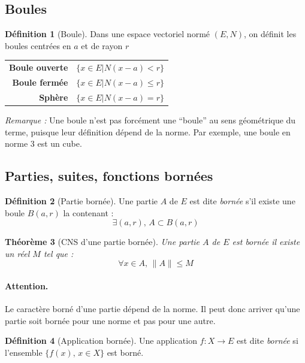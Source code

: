 \documentclass[11pt,a4paper]{report}
\newtheorem{theorem}{Théorème}[chapter]
\theoremstyle{definition}
\newtheorem{dfn}[theorem]{Définition}
\begin{document}
\subsection{Boules} %
\label{sub:boules}
\begin{dfn}[Boule]
Dans une espace vectoriel normé $(E,N)$, on définit les boules centrées en $a$ et de rayon $r$
    \begin{tabular}{>{\bfseries}r @{ de rayon $r$ centrée en $a$ : $\quad$ } l}
    Boule ouverte & $\{x \in E | N(x-a)< r \} $ \\
    Boule fermée & $\{x \in E | N(x-a)\le r \} $ \\
    Sphère & $\{x \in E | N(x-a)= r \} $ \\
    \end{tabular}
\end{dfn}
\emph{Remarque :} Une boule n'est pas forcément une ``boule'' au sens géométrique du terme, puisque leur définition dépend de la norme. Par exemple, une boule en norme 3 est un cube.

\subsection{Parties, suites, fonctions bornées} %
\label{sub:parties_suites_fonctions_bornees}
\begin{dfn}[Partie bornée]
     Une partie $A$ de $E$ est dite \emph{bornée} s'il existe une boule $B(a,r)$ la contenant : 
     \begin{equation}
     \exists(a,r),\, A \subset B(a,r)
     \end{equation}
\end{dfn}
\begin{theorem}[CNS d'une partie bornée]
     Une partie $A$ de $E$ est \emph{bornée} \Longleftrightarrow il existe un réel $M$ tel que :
     \begin{equation}
     \forall x\in A,\, \| A \| \le M
     \end{equation}
\end{theorem}
\paragraph{Attention.} Le caractère borné d'une partie dépend de la norme. Il peut donc arriver qu'une partie soit bornée pour une norme et pas pour une autre.
\begin{dfn}[Application bornée]
     Une application $f:X\to E$ est dite \emph{bornée} si l'ensemble $\lbrace f(x),\, x\in X\rbrace $ est borné.
\end{dfn}
\end{document}
